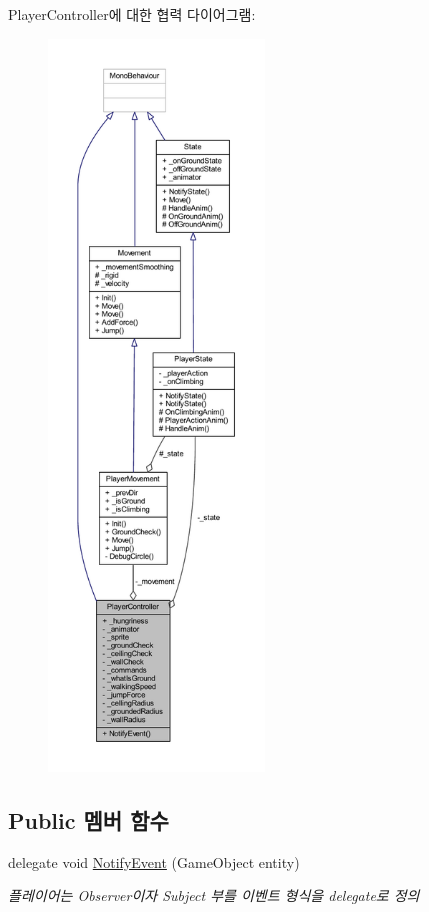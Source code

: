 Player\+Controller에 대한 협력 다이어그램\+:\nopagebreak
\begin{figure}[H]
\begin{center}
\leavevmode
\includegraphics[height=550pt]{db/de2/class_player_controller__coll__graph}
\end{center}
\end{figure}
\subsection*{Public 멤버 함수}
\begin{DoxyCompactItemize}
\item 
delegate void \mbox{\hyperlink{class_player_controller_a934c7f80b80276620cd60eaaeea7520e}{Notify\+Event}} (Game\+Object entity)
\begin{DoxyCompactList}\small\item\em 플레이어는 Observer이자 Subject 부를 이벤트 형식을 delegate로 정의 \end{DoxyCompactList}\end{DoxyCompactItemize}
